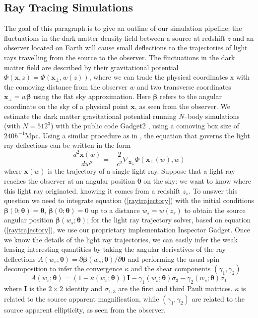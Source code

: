 \documentclass[reprint,aps,prd,superscriptaddress,showkeys]{revtex4-1}
\begin{document}
\subsection{Ray Tracing Simulations}
\label{raysim}
The goal of this paragraph is to give an outline of our simulation pipeline; the fluctuations in the dark matter density field between a source at redshift $z$ and an observer located on Earth will cause small deflections to the trajectories of light rays travelling from the source to the observer. The fluctuations in the dark matter field are described by their gravitational potential $\Phi(\mathbf{x},z)=\Phi(\mathbf{x}_\perp,w(z))$, where we can trade the physical coordinates $\mathrm{x}$ with the comoving distance from the observer $w$ and two transverse coordinates $\mathbf{x}_\perp=w\pmb{\beta}$ using the flat sky approximation. Here $\pmb{\beta}$ refers to the angular coordinate on the sky of a physical point $\mathbf{x}$, as seen from the observer. We estimate the dark matter gravitational potential running $N$--body simulations (with $N=512^3$) with the public code Gadget2 \citep{Gadget2}, using a comoving box size of $240h^{-1}$Mpc. Using a similar procedure as in \citep{RayTracingJain,RayTracingHartlap}, the equation that governs the light ray deflections can be written in the form
\begin{equation}
\label{raytrajectory}
\frac{d^2\mathbf{x}(w)}{dw^2} = -\frac{2}{c^2}\nabla_{\mathbf{x}_\perp}\Phi(\mathbf{x}_\perp(w),w)
\end{equation}
%
where $\mathbf{x}(w)$ is the trajectory of a single light ray. Suppose that a light ray reaches the observer at an angular position $\pmb{\theta}$ on the sky: we want to know where this light ray originated, knowing it comes from a redshift $z_s$. To answer this question we need to integrate equation (\ref{raytrajectory}) with the initial conditions $\pmb{\beta}(0;\pmb{\theta})=\pmb{\theta}$, $\dot{\pmb{\beta}}(0;\pmb{\theta})=0$ up to a distance $w_s=w(z_s)$ to obtain the source angular position $\pmb{\beta}(w_s;\pmb{\theta})$; for the light ray trajectory solver, based on equation (\ref{raytrajectory}), we use our proprietary implementation Inspector Gadget. Once we know the details of the light ray trajectories, we can easily infer the weak lensing interesting quantities by taking the angular derivatives of the ray deflections $A(w_s;\pmb{\theta}) = \partial \pmb{\beta}(w_s;\pmb{\theta})/\partial\pmb{\theta}$ and performing the usual spin decomposition to infer the convergence $\kappa$ and the shear components $(\gamma_1,\gamma_2)$
%
\begin{equation}
A(w_s;\pmb{\theta}) = (1-\kappa(w_s;\pmb{\theta}))\pmb{I} - \gamma_1(w_s;\pmb{\theta})\sigma_3 - \gamma_2(w_s;\pmb{\theta})\sigma_1
\end{equation}  
%
where $\pmb{I}$ is the $2\times2$ identity and $\sigma_{1,3}$ are the first and third Pauli matrices. $\kappa$ is related to the source apparent magnification, while $(\gamma_1,\gamma_2)$ are related to the source apparent ellipticity, as seen from the observer. 
\end{document}
